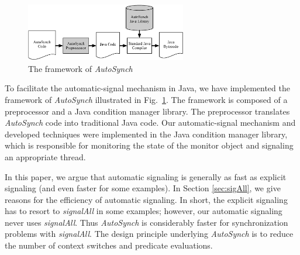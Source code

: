 \documentclass[preprint]{sigplanconf}
\begin{document}
\begin{figure}[ht!]
  \centering
  \includegraphics[width=70mm]{fig/flow.eps}
  \caption{The framework of {\em  AutoSynch}}
  \label{fig:fw}
\end{figure}


To facilitate the automatic-signal mechanism in Java, we have implemented the 
framework of {\em AutoSynch} illustrated in Fig.~\ref{fig:fw}. 
The framework is composed of a 
preprocessor and a Java condition manager library. The preprocessor translates 
{\em AutoSynch} code into traditional Java code. 
Our automatic-signal mechanism and 
developed techniques were implemented in the Java condition manager library, 
which is responsible for monitoring the state of the monitor object
and signaling an appropriate thread.


%


In this paper, we argue that automatic signaling is generally as fast as explicit 
signaling (and even faster for some examples). In Section \ref{sec:sigAll}, we give reasons
for the efficiency of automatic signaling. In short, the explicit signaling has 
to resort to {\em signalAll} in some examples; however, our automatic signaling never 
uses {\em signalAll}. Thus {\em AutoSynch} is 
considerably faster for synchronization problems with 
{\em signalAll}. The design principle underlying {\em AutoSynch} is to reduce 
the number of context switches and predicate evaluations.
\end{document}
